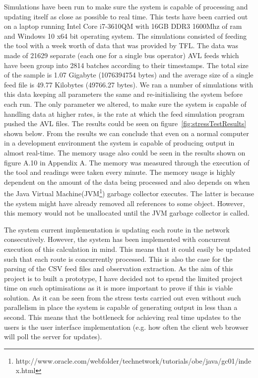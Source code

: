 Simulations have been run to make sure the system is capable of processing and updating itself as close as possible to real time. This tests have been carried out on a laptop running Intel Core i7-3610QM with 16GB DDR3 1600Mhz of ram and Windows 10 x64 bit operating system. The simulations consisted of feeding the tool with a week worth of data that was provided by TFL. The data was made of 21629 separate (each one for a single bus operator) AVL feeds which have been group into 2814 batches according to their timestamps. The total size of the sample is 1.07 Gigabyte (1076394754 bytes) and the average size of a single feed file is 49.77 Kilobytes (49766.27 bytes). We ran a number of simulations with this data keeping all parameters the same and re-initialising the system before each run. The only parameter we altered, to make sure the system is capable of handling data at higher rates, is the rate at which the feed simulation program pushed the AVL files. The results could be seen on figure~\ref{fig:stressTestResults} shown below. From the results we can conclude that even on a normal computer in a development environment the system is capable of producing output in almost real-time. The memory usage also could be seen in the results shown on figure A.10 in Appendix A. The memory was measured through the execution of the tool and readings were taken every minute. The memory usage is highly dependent on the amount of the data being processed and also depends on when the Java Virtual Machine(JVM\footnote{http://www.oracle.com/webfolder/technetwork/tutorials/obe/java/gc01/index.html}) garbage collector executes. The latter is because the system might have already removed all references to some object. However, this memory would not be unallocated until the JVM garbage collector is called.

The system current implementation is updating each route in the network consecutively. However, the system has been implemented with concurrent execution of this calculation in mind. This means that it could easily be updated such that each route is concurrently processed. This is also the case for the parsing of the CSV feed files and observation extraction. As the aim of this project is to built a prototype, I have decided not to spend the limited project time on such optimisations as it is more important to prove if this is viable solution. As it can be seen from the stress tests carried out even without such parallelism in place the system is capable of  generating output in less than a second. This means that the bottleneck for achieving real time updates to the users is the user interface implementation (e.g. how often the client web browser will poll the server for updates).

